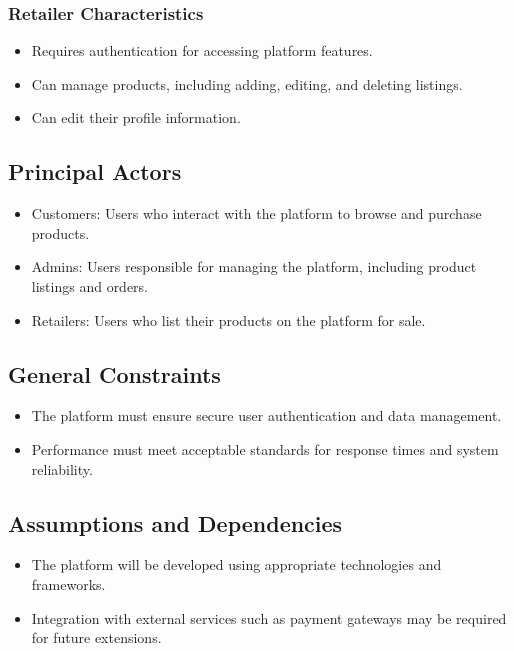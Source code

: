 \documentclass{article}
\begin{document}
\subsubsection{Retailer Characteristics}
\begin{itemize}[label=-]
    \item Requires authentication for accessing platform features.
    \item Can manage products, including adding, editing, and deleting listings.
    \item Can edit their profile information.
\end{itemize}

\subsection{Principal Actors}
\begin{itemize}[label=-]
    \item Customers: Users who interact with the platform to browse and purchase products.
    \item Admins: Users responsible for managing the platform, including product listings and orders.
    \item Retailers: Users who list their products on the platform for sale.
\end{itemize}

\subsection{General Constraints}
\begin{itemize}[label=-]
    \item The platform must ensure secure user authentication and data management.
    \item Performance must meet acceptable standards for response times and system reliability.
\end{itemize}

\subsection{Assumptions and Dependencies}
\begin{itemize}[label=-]
    \item The platform will be developed using appropriate technologies and frameworks.
    \item Integration with external services such as payment gateways may be required for future extensions.
\end{itemize}
\end{document}
